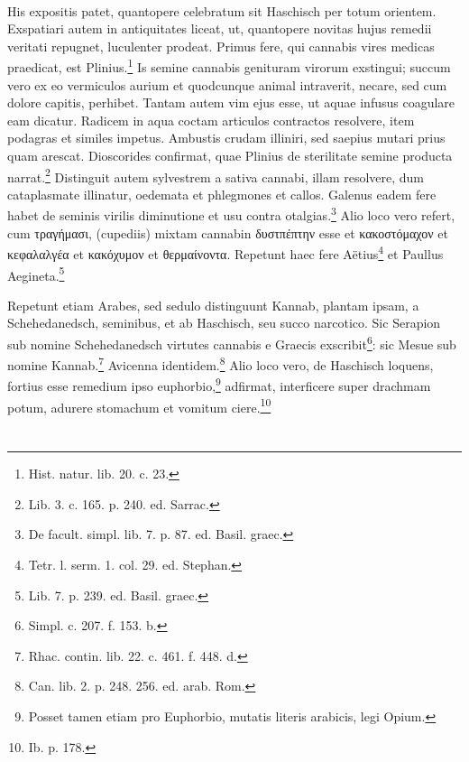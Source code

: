 \documentclass[a4paper, 11pt, oneside, polutonikogreek, english]{article}
\begin{document}
\paragraph{}
His expositis patet, quantopere celebratum sit Haschisch per totum orientem. Exspatiari autem in antiquitates liceat, ut, quantopere novitas hujus remedii veritati repugnet, luculenter prodeat. Primus fere, qui cannabis vires medicas praedicat, est Plinius.\footnote{Hist. natur. lib. 20. c. 23.} Is semine cannabis genituram virorum exstingui; succum vero ex eo vermiculos aurium et quodcunque animal intraverit, necare, sed cum dolore capitis, perhibet. Tantam autem vim ejus esse, ut aquae infusus coagulare eam dicatur. Radicem in aqua coctam articulos contractos resolvere, item podagras et similes impetus. Ambustis crudam illiniri, sed saepius mutari prius quam arescat. Dioscorides confirmat, quae Plinius de sterilitate semine producta narrat.\footnote{Lib. 3. c. 165. p. 240. ed. Sarrac.} Distinguit autem sylvestrem a sativa cannabi, illam resolvere, dum cataplasmate illinatur, oedemata et phlegmones et callos. Galenus eadem fere habet de seminis virilis diminutione et usu contra otalgias.\footnote{De facult. simpl. lib. 7. p. 87. ed. Basil. graec.} Alio loco vero refert, cum τραγήμασι, (cupediis) mixtam cannabin δυστπέπτην esse et κακοστόμαχον et κεφαλαλγέα et κακόχυμον et θερμαίνοντα. Repetunt haec fere Aëtius\footnote{Tetr. l. serm. 1. col. 29. ed. Stephan.} et Paullus Aegineta.\footnote{Lib. 7. p. 239. ed. Basil. graec.}

Repetunt etiam Arabes, sed sedulo distinguunt Kannab, plantam ipsam, a Schehedanedsch, seminibus, et ab Haschisch, seu succo narcotico. Sic Serapion sub nomine Schehedanedsch virtutes cannabis e Graecis exscribit\footnote{Simpl. c. 207. f. 153. b.}: sic Mesue sub nomine Kannab.\footnote{Rhac. contin. lib. 22. c. 461. f. 448. d.} Avicenna identidem.\footnote{Can. lib. 2. p. 248. 256. ed. arab. Rom.} Alio loco vero, de Haschisch loquens, fortius esse remedium ipso euphorbio,\footnote{Posset tamen etiam pro Euphorbio, mutatis literis arabicis, legi Opium.} adfirmat, interficere super drachmam potum, adurere stomachum et vomitum ciere.\footnote{Ib. p. 178.}
\section{}
\end{document}
